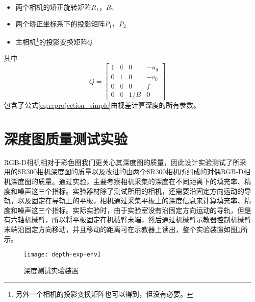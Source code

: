 \begin{itemize}
\item 两个相机的矫正旋转矩阵$R_1$，$R_2$
\item 两个矫正坐标系下的投影矩阵$P_1$，$P_2$
\item 主相机\footnote{另外一个相机的投影变换矩阵也可以得到，但没有必要。}的投影变换矩阵$Q$
\end{itemize}
其中
\begin{equation}
  Q = \left[
    \begin{array}{cccc}
      1&0&0&-u_0 \\
       0&1&0&-v_0 \\
       0&0&0&f \\
       0&0&1/B&0
    \end{array}
    \right]
\end{equation}
包含了公式\ref{eq:reprojection_simple}由视差计算深度的所有参数。

\section{深度图质量测试实验}
RGB-D相机相对于彩色图我们更关心其深度图的质量，因此设计实验测试了所采用的SR300相机深度图的质量以及改进的由两个SR300相机所组成的对偶RGB-D相机深度图的质量。通过实验，主要考察相机采集的深度在不同距离下的填充率、精度和噪声这三个指标。实验器材除了测试所用的相机，还需要沿固定方向运动的导轨，以及固定在导轨上的平板，相机通过采集平板上的深度信息来计算填充率、精度和噪声这三个指标。实际实验时，由于实验室没有沿固定方向运动的导轨，但是有六轴机械臂，所以将平板固定在机械臂末端，然后通过机械臂示教器控制机械臂末端沿固定方向移动，并且移动的距离可在示教器上读出，整个实验装置如图\ref{fig:depth_exp_env}所示。
\begin{figure}
  \centering
  \texttt{[image: depth-exp-env]}
  \caption{深度测试实验装置}
  \label{fig:depth_exp_env}
\end{figure}

